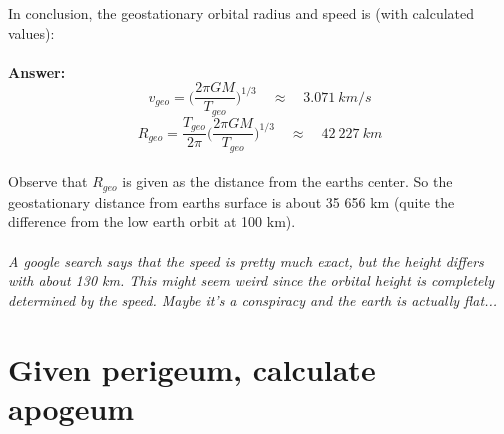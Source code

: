 \documentclass{article}
\begin{document}
In conclusion, the geostationary orbital radius and speed is (with calculated values):
\\ \\
\textbf{Answer:}
\\
$$
v_{geo}=\Big(\frac{2\pi GM}{T_{geo}}\Big)^{1/3} \quad \approx \quad 3.071 \ km/s
$$
$$
R_{geo}=\frac{T_{geo}}{2\pi}\Big(\frac{2\pi GM}{T_{geo}}\Big)^{1/3} \quad \approx \quad 42 \ 227 \ km
$$
\\

Observe that $R_{geo}$ is given as the distance from the earths center. So the geostationary distance from earths surface is about 35 656 km (quite the difference from the low earth orbit at 100 km).
\\ \\
\textit{A google search says that the speed is pretty much exact, but the height differs with about 130 km. This might seem weird since the orbital height is completely determined by the speed. Maybe it's a conspiracy and the earth is actually flat...}
\section*{Given perigeum, calculate apogeum}
\end{document}
